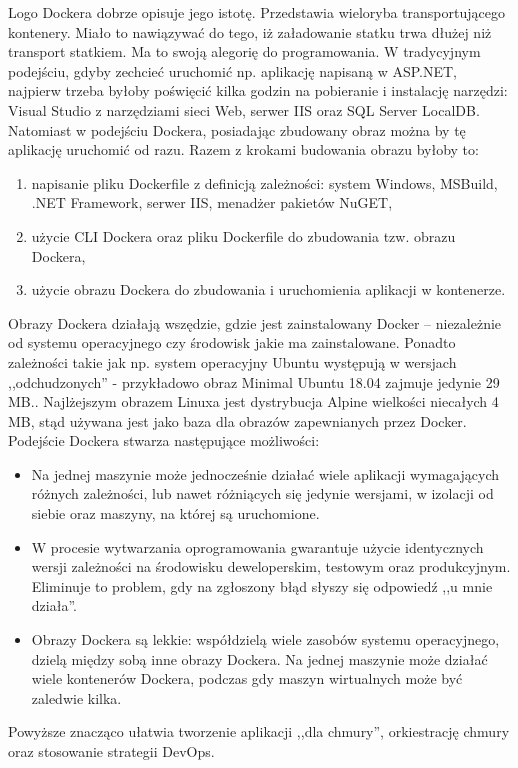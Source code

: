 \documentclass[12pt,a4paper,twoside,titlepage,openright]{book}
\begin{document}
Logo Dockera dobrze opisuje jego istotę. Przedstawia wieloryba transportującego kontenery. Miało to nawiązywać do tego, iż załadowanie statku trwa dłużej niż transport statkiem. Ma to swoją alegorię do programowania. W tradycyjnym podejściu, gdyby zechcieć uruchomić np. aplikację napisaną w ASP.NET, najpierw trzeba byłoby poświęcić kilka godzin na pobieranie i instalację narzędzi: Visual Studio z narzędziami sieci Web, serwer IIS oraz SQL Server LocalDB. Natomiast w podejściu Dockera, posiadając zbudowany obraz można by tę aplikację uruchomić od razu. Razem z krokami budowania obrazu byłoby to:
\begin{enumerate}
\item napisanie pliku Dockerfile z definicją zależności: system Windows, MSBuild, .NET Framework, serwer IIS, menadżer pakietów NuGET,
\item użycie CLI Dockera oraz pliku Dockerfile do zbudowania tzw. obrazu Dockera,
\item użycie obrazu Dockera do zbudowania i uruchomienia aplikacji w kontenerze.
\end{enumerate}
Obrazy Dockera działają wszędzie, gdzie jest zainstalowany Docker -- niezależnie od systemu operacyjnego czy środowisk jakie ma zainstalowane. Ponadto zależności takie jak np. system operacyjny Ubuntu występują w wersjach ,,odchudzonych'' - przykładowo obraz Minimal Ubuntu 18.04 zajmuje jedynie 29 MB.\cite{siteUbuntuBlog}. Najlżejszym obrazem Linuxa jest dystrybucja Alpine wielkości niecałych 4 MB, stąd używana jest jako baza dla obrazów zapewnianych przez Docker.\cite{dockerPacktMastering}
Podejście Dockera stwarza następujące możliwości:
\begin{itemize}
\item Na jednej maszynie może jednocześnie działać wiele aplikacji wymagających różnych zależności, lub nawet różniących się jedynie wersjami, w izolacji od siebie oraz maszyny, na której są uruchomione.
\item W procesie wytwarzania oprogramowania gwarantuje użycie identycznych wersji zależności na środowisku deweloperskim, testowym oraz produkcyjnym. Eliminuje to problem, gdy na zgłoszony błąd słyszy się odpowiedź ,,u mnie działa''.
\item Obrazy Dockera są lekkie: współdzielą wiele zasobów systemu operacyjnego, dzielą między sobą inne obrazy Dockera.\cite{siteDockerStackOverflow} Na jednej maszynie może działać wiele kontenerów Dockera, podczas gdy maszyn wirtualnych może być zaledwie kilka.\cite{ccSpringer}
\end{itemize}
Powyższe znacząco ułatwia tworzenie aplikacji ,,dla chmury'', orkiestrację chmury oraz stosowanie strategii DevOps.
\end{document}
